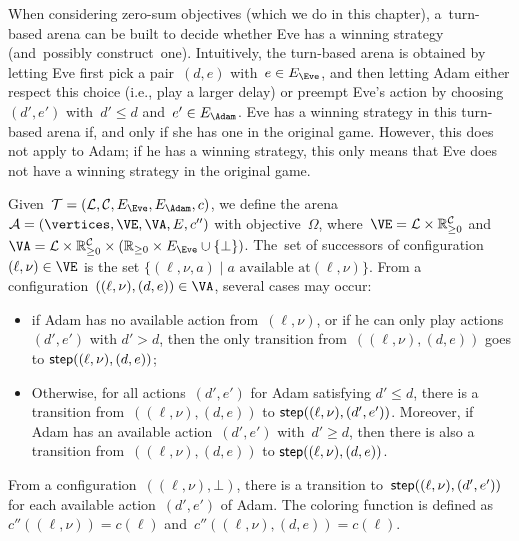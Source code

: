 \begin{remark}
\label{9-rmk:reduction_zero_sum}
When considering zero-sum objectives (which we do in this chapter),
a~turn-based arena can be built to decide whether Eve has a winning
strategy (and~possibly construct~one).  Intuitively, the turn-based
arena is obtained by letting Eve first pick a pair~$(d,e)$ with~$e
\in \EE$, and then letting Adam either respect this choice (i.e.,
play a larger delay) or preempt Eve's action by choosing $(d',e')$
with~$d' \leq d$ and~$e' \in \EA$.
Eve has a winning strategy in this turn-based arena if, and only if she has one in the original game.
However, this does not apply to Adam; if he has a winning strategy, this only means that Eve
does not have a winning strategy in the original game.

Given~$\calT = (\Locs, \Clocks,\EE,\EA, c)$, we define the arena~$\TA
= (\vertices,\VE,\VA,E, c'')$ 
with objective~$\Omega$, where~$\VE = \Locs\times \Realnn^\Clocks$ and
$\VA=\Locs\times\Realnn^\Clocks\times(\Realnn \times \EE
\cup\{\bot\})$.  The~set of successors of configuration~$(\ell,\nu)
\in \VE$ is the set $\{(\ell,\nu,a)\mid a \text{ available at
}(\ell,\nu)\}$.
From a configuration~$((\ell,\nu),(d,e))\in\VA$, several cases may
occur:
\begin{itemize}
\item if Adam has no available action from~$(\ell,\nu)$, or if he can
  only play actions~$(d',e')$ with $d'>d$, then the only transition
  from~$((\ell,\nu),(d,e))$ goes to $\mathsf{step}((\ell,\nu),(d,e))$;
\item Otherwise, for all actions~$(d',e')$ for Adam satisfying $d'\leq d$,
  there is a transition from~$((\ell,\nu),(d,e))$
  to $\mathsf{step}((\ell,\nu),(d',e'))$.
  Moreover, if Adam has an available action~$(d',e')$ with~$d'\geq d$,
  then there is also a transition
  from~$((\ell,\nu),(d,e))$ to $\mathsf{step}((\ell,\nu),(d,e))$.
\end{itemize}
From a configuration~$((\ell,\nu),\bot)$, there is a transition
to~$\mathsf{step}((\ell,\nu),(d',e'))$ for each available action~$(d',e')$
of Adam.
The coloring function is defined as~$c''((\ell,\nu)) = c(\ell)$
and~$c''((\ell,\nu),(d,e)) = c(\ell)$.


\end{remark}
